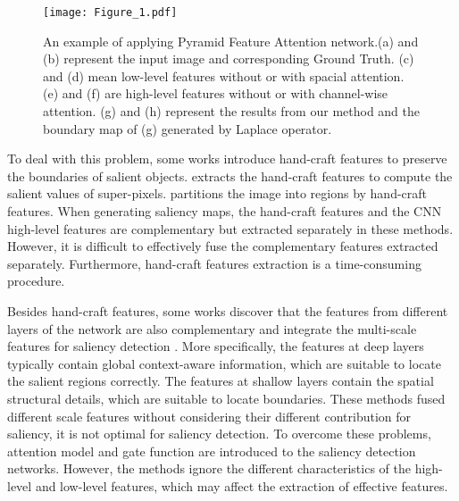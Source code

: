 \documentclass[10pt,twocolumn,letterpaper]{article}
\begin{document}
\begin{figure}[h]
\centering
\texttt{[image: Figure\_1.pdf]}
\caption{An example of applying Pyramid Feature Attention network.(a) and (b) represent the input image and corresponding Ground Truth. (c) and (d) mean low-level features without or with spacial attention.  (e) and (f) are high-level features without or with channel-wise attention. (g) and (h) represent the results from our method and the boundary map of (g) generated by Laplace operator.}
\label{fig:Figure_1}
\end{figure}


To deal with this problem, some works introduce hand-craft features to preserve the boundaries of salient objects\cite{eld,region_pix}. \cite{eld} extracts the hand-craft features to compute the salient values of super-pixels. \cite{region_pix} partitions the image into regions by hand-craft features. When generating saliency maps, the hand-craft features and the CNN high-level features are complementary but extracted separately in these methods. However,  it is difficult to effectively fuse the complementary features extracted separately. Furthermore, hand-craft features extraction is a time-consuming procedure.


Besides hand-craft features, some works discover that the features from different layers of the network are also complementary and integrate the multi-scale features for saliency detection \cite{dss,amulet,dsrn}. More specifically, the features at deep layers typically contain global context-aware information, which are suitable to locate the salient regions correctly. The features at shallow layers contain the spatial structural details, which are suitable to locate boundaries. These methods fused different scale features without considering their different contribution for saliency, it is not optimal for saliency detection. To overcome these problems, attention model \cite{pagrn} and gate function \cite{bdmpm} are introduced to the saliency detection networks. However, the methods ignore the different characteristics of the high-level and low-level features, which may affect the extraction of effective features.
\end{document}

